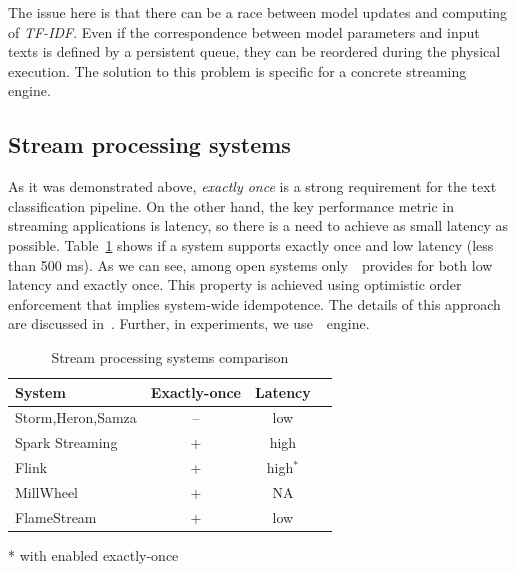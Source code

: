 The issue here is that there can be a race between model updates and computing of {\em TF-IDF}. Even if the correspondence between model parameters and input texts is defined by a persistent queue, they can be reordered during the physical execution. The solution to this problem is specific for a concrete streaming engine.

\subsection{Stream processing systems}

As it was demonstrated above, {\em exactly once} is a strong requirement for the text classification pipeline. On the other hand, the key performance metric in streaming applications is latency, so there is a need to achieve as small latency as possible. Table~\ref{comparison} shows if a system supports exactly once and low latency (less than 500 ms). As we can see, among open systems only~\FlameStream\ provides for both low latency and exactly once. This property is achieved using optimistic order enforcement that implies system-wide idempotence. The details of this approach are discussed in~\cite{we2018adbis, we2018beyondmr}. Further, in experiments, we use~\FlameStream\ engine.

\begin{table}[htbp]
\begin{threeparttable}
\begin{tabular}{lccl}
System             & Exactly-once & Latency    \\
\hline
Storm,Heron,Samza        &    --   &   low            \\
Spark Streaming    &    +    &   high           \\
Flink              &    +     &    high$^*$       \\
MillWheel          &    +    &   NA             \\
FlameStream        &    +    &   low            \\
\end{tabular}
* with enabled exactly-once~\cite{we2018beyondmr}
\end{threeparttable}
\caption{Stream processing systems comparison}
\label{comparison}
\end{table}